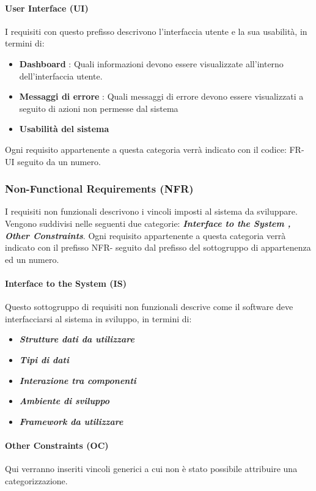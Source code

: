 \documentclass[a4paper,12pt]{article}
\begin{document}
    \paragraph{User Interface (UI)}
    I requisiti con questo prefisso descrivono l'interfaccia utente e la sua usabilità, in termini di:
    \begin{itemize}
        \item \textbf{Dashboard} : Quali informazioni devono essere visualizzate all'interno dell'interfaccia utente.
        \item \textbf{Messaggi di errore} : Quali messaggi di errore devono essere visualizzati a seguito di azioni non permesse dal sistema
        \item \textbf{Usabilità del sistema}
    \end{itemize}
    Ogni requisito appartenente a questa categoria verrà indicato con il codice: FR-UI seguito da un numero.
    \subsubsection{Non-Functional Requirements (NFR)}
    I requisiti non funzionali descrivono i vincoli imposti al sistema da sviluppare. Vengono suddivisi nelle seguenti due categorie: \textbf{\textit{Interface to the System , Other Constraints}}.
    Ogni requisito appartenente a questa categoria verrà indicato con il prefisso NFR- seguito dal prefisso del sottogruppo di appartenenza ed un numero.
    \paragraph{Interface to the System (IS)}
    Questo sottogruppo di requisiti non funzionali descrive come il software deve interfacciarsi al sistema in sviluppo, in termini di:
    \begin{itemize}
        \item \textbf{\textit{Strutture dati da utilizzare}}
        \item \textbf{\textit{Tipi di dati}}
        \item \textbf{\textit{Interazione tra componenti }}
        \item \textbf{\textit{Ambiente di sviluppo}}
        \item \textbf{\textit{Framework da utilizzare}}
    \end{itemize}
    \paragraph{Other Constraints (OC)}
    Qui verranno inseriti vincoli generici a cui non è stato possibile attribuire una categorizzazione.
\end{document}
